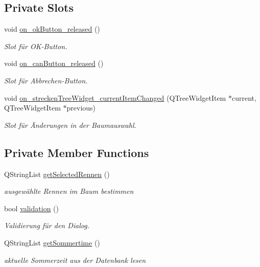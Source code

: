 \subsection*{Private Slots}
\begin{CompactItemize}
\item 
void \hyperlink{class_hardware_konfiguration_eda81840a5d1f60c63eb9898e98dbaf8}{on\_\-okButton\_\-released} ()
\begin{CompactList}\small\item\em Slot für OK-Button. \item\end{CompactList}\item 
void \hyperlink{class_hardware_konfiguration_466e1fc199b46929f823e5ebab041854}{on\_\-canButton\_\-released} ()
\begin{CompactList}\small\item\em Slot für Abbrechen-Button. \item\end{CompactList}\item 
void \hyperlink{class_hardware_konfiguration_7a08d07a1224b1f4b6e6af2366685463}{on\_\-streckenTreeWidget\_\-currentItemChanged} (QTreeWidgetItem $\ast$current, QTreeWidgetItem $\ast$previous)
\begin{CompactList}\small\item\em Slot für Änderungen in der Baumauswahl. \item\end{CompactList}\end{CompactItemize}
\subsection*{Private Member Functions}
\begin{CompactItemize}
\item 
QStringList \hyperlink{class_hardware_konfiguration_dae436cb5061cb83f6b8fcd823ad79ae}{getSelectedRennen} ()
\begin{CompactList}\small\item\em ausgewählte Rennen im Baum bestimmen \item\end{CompactList}\item 
bool \hyperlink{class_hardware_konfiguration_322f69fe2384198fd83509ae35353f75}{validation} ()
\begin{CompactList}\small\item\em Validierung für den Dialog. \item\end{CompactList}\item 
QStringList \hyperlink{class_hardware_konfiguration_26b0567a1972d8bb30dd3065cfc03b17}{getSommertime} ()
\begin{CompactList}\small\item\em aktuelle Sommerzeit aus der Datenbank lesen \item\end{CompactList}\end{CompactItemize}
